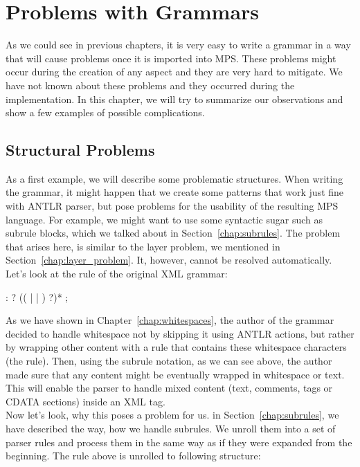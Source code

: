 \chapter{Problems with Grammars}
\label{chap:problems_with_grammars}

As we could see in previous chapters, it is very easy to write a grammar in a way that will cause problems once it is imported into MPS.
These problems might occur during the creation of any aspect and they are very hard to mitigate.
We have not known about these problems and they occurred during the implementation.
In this chapter, we will try to summarize our observations and show a few examples of possible complications.
\\

\section{Structural Problems}

As a first example, we will describe some problematic structures.
When writing the grammar, it might happen that we create some patterns that work just fine with ANTLR parser, but pose problems for the usability of the resulting MPS language.
For example, we might want to use some syntactic sugar such as subrule blocks, which we talked about in Section~\ref{chap:subrules}.
The problem that arises here, is similar to the layer problem, we mentioned in Section~\ref{chap:layer_problem}.
It, however, cannot be resolved automatically.
Let's look at the  rule of the original XML grammar:

\begin{antlr}
	 :   ? (( |  | ) ?)* ;
\end{antlr}

As we have shown in Chapter~\ref{chap:whitespaces}, the author of the grammar decided to handle whitespace not by skipping it using ANTLR actions, but rather by wrapping other content with a rule that contains these whitespace characters (the  rule).
Then, using the subrule notation, as we can see above, the author made sure that any content might be eventually wrapped in whitespace or text.
This will enable the parser to handle mixed content (text, comments, tags or CDATA sections) inside an XML tag.
\\

Now let's look, why this poses a problem for us.
in Section~\ref{chap:subrules}, we have described the way, how we handle subrules.
We unroll them into a set of parser rules and process them in the same way as if they were expanded from the beginning.
The rule above is unrolled to following structure:

